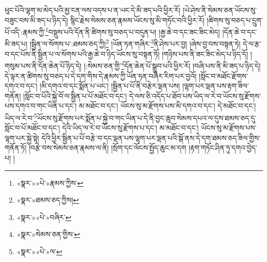 ཕུང་པོའི་ལྷག་མ་མེད་པའི་མྱ་ངན་ལས་འདས་པ་ན་ཡང་དེ་མི་ཟད་པའི་ཕྱིར་རོ། །ཡེ་ཤེས་ནི་སེམས་ཅན་ཡོངས་སུ་བཟུང་བས་མི་ཟད་པ་ཉིད་དེ། སྙིང་རྗེས་སེམས་ཅན་རྣམས་ཡོངས་སུ་མི་གཏོང་བའི་ཕྱིར་རོ། །ཚིགས་སུ་བཅད་པ་དྲུག་པོ་འདི་:རྣམས་ཀྱི་\footnote{«སྣར་»«པེ་»རྣམས་ཀྱིས་}བསྡུས་པའི་དོན་ནི་ཚིགས་སུ་བཅད་པ་བདུན་པ། །རྒྱ་ཆེ་བ་དང་ཟང་ཟིང་མེད། །དོན་ཆེ་བ་དང་མི་ཟད་པ། །སྦྱིན་ལ་སོགས་པ་:ཐམས་ཅད་ཀྱི།\footnote{«སྣར་»ཐམས་ཅད་ཀྱིས།} །ཡོན་ཏན་གཞིར་\footnote{«སྣར་»«པེ་»བཞིར་}ནི་ཤེས་པར་བྱ། །ཞེས་བྱ་བས་བསྟན་ཏེ། དེ་ལ་རྩ་བ་དང་པོས་ནི་སྦྱིན་པ་ལ་སོགས་པའི་རྒྱ་ཆེ་བ་ཉིད་ཡོངས་སུ་བསྟན་ཏོ། །གཉིས་པས་ནི་ཟང་ཟིང་མེད་པ་ཉིད་དོ། །གསུམ་པས་ནི་དོན་ཆེན་པོ་ཉིད་དེ། །:སེམས་ཅན་གྱི་\footnote{«སྣར་»སེམས་ཅན་གྱིས་}དོན་ཆེན་པོ་སྒྲུབ་པའི་ཕྱིར་རོ། །བཞི་པས་ནི་མི་ཟད་པ་ཉིད་དེ། དེ་ལྟར་ན་ཚིགས་སུ་བཅད་པ་དེ་དག་གིས་དེ་རྣམས་ཀྱི་ཡོན་ཏན་བཞིར་རིག་པར་བྱའོ། །སློང་བ་མཐོང་རྫོགས་དགའ་བ་དང་། །མི་དགའ་བ་དང་སྨོན་པ་ཡང་། །སྦྱིན་པ་པོ་ནི་བརྩེར་ལྡན་པས། །ལྷག་པར་ལྡན་པས་རྟག་ཟིལ་གནོན། །སློང་བ་པོའི་སྐྱེ་བོ་ལ་སྦྱིན་པ་པོ་མཐོང་བ་དང་། དེ་ལས་ཅི་འདོད་པ་ཐོབ་པས་ཡིད་ལ་རེ་བ་ཡོངས་སུ་རྫོགས་པས་དགའ་བ་གང་ཡིན་པ་དང་། མ་མཐོང་བ་དང་། ཡོངས་སུ་མ་རྫོགས་པས་མི་དགའ་བ་དང་། དེ་མཐོང་བ་དང་། ཡིད་ལ་རེ་བ་\footnote{«སྣར་»«པེ་»ལ་}ཡོངས་སུ་རྫོགས་པར་སྨོན་པ་སྐྱེ་བ་གང་ཡིན་པ་དེ་ནི་བྱང་ཆུབ་སེམས་དཔའ་ལ་དུས་ཐམས་ཅད་དུ་སློང་བ་པོ་མཐོང་བ་དང་། དེའི་ཡིད་ལ་རེ་བ་ཡོངས་སུ་རྫོགས་པ་དང་། མ་མཐོང་བ་དང་། ཡོངས་སུ་མ་རྫོགས་པས་ལྷག་པར་སྐྱེ་སྟེ། དེའི་ཕྱིར་སྦྱིན་པ་པོ་བརྩེ་བ་དང་ལྡན་པས་ལྷག་པར་ལྡན་པའི་སྒོ་ནས་དེ་དག་ཐམས་ཅད་ཟིལ་གྱིས་གནོན་ཏོ། །བརྩེ་བས་སེམས་ཅན་རྣམས་ལ་ནི། །སྲོག་དང་ལོངས་སྤྱོད་ཆུང་མ་དག །རྟག་གཏོང་ཤིན་ཏུ་དགའ་བྱེད་པ། །
